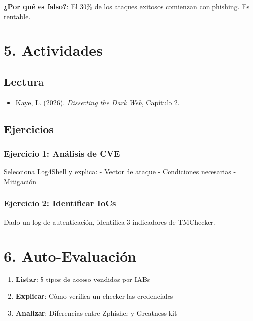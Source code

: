 \documentclass[
  letterpaper,
]{report}
\providecommand{\tightlist}{%
  \setlength{\itemsep}{0pt}\setlength{\parskip}{0pt}}
\begin{document}
\textbf{¿Por qué es falso?}: El 30\% de los ataques exitosos comienzan
con phishing. Es rentable.

\section{5. Actividades}\label{actividades-2}

\subsection{Lectura}\label{lectura-1}

\begin{itemize}
\tightlist
\item
  Kaye, L. (2026). \emph{Dissecting the Dark Web}, Capítulo 2.
\end{itemize}

\subsection{Ejercicios}\label{ejercicios-1}

\subsubsection{Ejercicio 1: Análisis de
CVE}\label{ejercicio-1-anuxe1lisis-de-cve}

Selecciona Log4Shell y explica: - Vector de ataque - Condiciones
necesarias - Mitigación

\subsubsection{Ejercicio 2: Identificar
IoCs}\label{ejercicio-2-identificar-iocs}

Dado un log de autenticación, identifica 3 indicadores de TMChecker.

\section{6. Auto-Evaluación}\label{auto-evaluaciuxf3n-2}

\begin{enumerate}
\def\labelenumi{\arabic{enumi}.}
\tightlist
\item
  \textbf{Listar}: 5 tipos de acceso vendidos por IABs
\item
  \textbf{Explicar}: Cómo verifica un checker las credenciales
\item
  \textbf{Analizar}: Diferencias entre Zphisher y Greatness kit
\end{enumerate}
\end{document}
